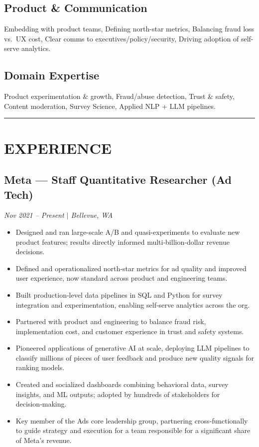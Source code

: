 \documentclass[11pt,a4paper]{article}
\newcommand{\sepline}{\noindent\rule{\textwidth}{0.5pt}\vspace{0.5em}}
\begin{document}
\subsection*{Product \& Communication}
Embedding with product teams, Defining north-star metrics, Balancing fraud loss vs.\ UX cost, Clear comms to executives/policy/security, Driving adoption of self-serve analytics.

\subsection*{Domain Expertise}
Product experimentation \& growth, Fraud/abuse detection, Trust \& safety, Content moderation, Survey Science, Applied NLP + LLM pipelines.

\vspace{0.5em}
\sepline

\section*{EXPERIENCE}

\subsection*{Meta --- Staff Quantitative Researcher (Ad Tech)}
\textit{Nov 2021 -- Present $\mid$ Bellevue, WA}
\begin{itemize}
    \item Designed and ran large-scale A/B and quasi-experiments to evaluate new product features; results directly informed multi‑billion‑dollar revenue decisions.
    \item Defined and operationalized north‑star metrics for ad quality and improved user experience, now standard across product and engineering teams.
    \item Built production‑level data pipelines in SQL and Python for survey integration and experimentation, enabling self‑serve analytics across the org.
    \item Partnered with product and engineering to balance fraud risk, implementation cost, and customer experience in trust and safety systems.
    \item Pioneered applications of generative AI at scale, deploying LLM pipelines to classify millions of pieces of user feedback and produce new quality signals for ranking models.
    \item Created and socialized dashboards combining behavioral data, survey insights, and ML outputs; adopted by hundreds of stakeholders for decision‑making.
    \item Key member of the Ads core leadership group, partnering cross‑functionally to guide strategy and execution for a team responsible for a significant share of Meta's revenue.
\end{itemize}
\end{document}
